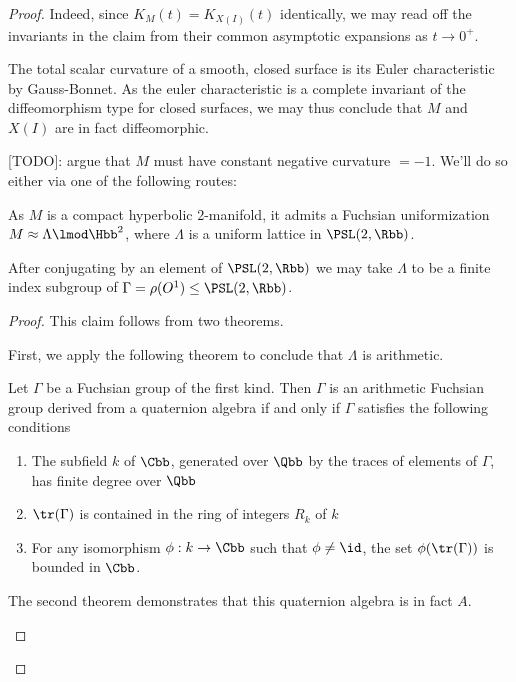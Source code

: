 \begin{proof}
  Indeed, since $K_M(t) = K_{X(I)}(t)$ identically, we may read off the invariants in the claim from their common asymptotic expansions as $t\to 0^+$.
  \begin{rem}
    The total scalar curvature of a smooth, closed surface is its Euler characteristic by Gauss-Bonnet. As the euler characteristic is a complete invariant of the diffeomorphism type for closed surfaces, we may thus conclude that $M$ and $X(I)$ are in fact diffeomorphic.
  \end{rem}

  [TODO]: argue that $M$ must have constant negative curvature $=-1$. We'll do so either via one of the following routes:


  As $M$ is a compact hyperbolic $2$-manifold, it admits a Fuchsian uniformization $M \approx \Lambda \lmod \Hbb^2$, where $\Lambda$ is a uniform lattice in $\PSL(2,\Rbb)$.
  \begin{claim}
    After conjugating by an element of $\PSL(2,\Rbb)$ we may take $\Lambda$ to be a finite index subgroup of $\Gamma = \rho(O^1) \leq  \PSL(2,\Rbb)$.
  \end{claim}
  \begin{proof}
    This claim follows from two theorems.

    First, we apply the following theorem to conclude that $\Lambda$ is arithmetic.
    \begin{thm}\label{thm:takeuchi}
      Let $\Gamma$ be a Fuchsian group of the first kind. Then $\Gamma$ is an arithmetic Fuchsian group derived from a quaternion algebra if and only if $\Gamma$ satisfies the following conditions
      \begin{enumerate}
        \item The subfield $k$ of $\Cbb$, generated over $\Qbb$ by the traces of elements of $\Gamma$, has finite degree over $\Qbb$
        \item $\tr(\Gamma)$ is contained in the ring of integers $R_{k}$ of $k$
        \item For any isomorphism $\phi: k \to \Cbb$ such that $\phi \neq \id$, the set $\phi(\tr(\Gamma))$ is bounded in $\Cbb$.
      \end{enumerate}
    \end{thm}

    The second theorem demonstrates that this quaternion algebra is in fact $A$.
    \begin{thm}


\end{thm}
\end{proof}
\end{proof}
